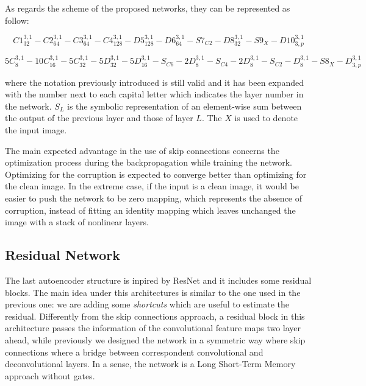 \documentclass[12pt,a4paper]{report}
\begin{document}
As regards the scheme of the proposed networks, they can be represented as follow:

\begin{equation}
C1_{32}^{3,1} - C2_{64}^{3,1} - C3_{64}^{3,1} - C4_{128}^{3,1} - D5_{128}^{3,1} - D6_{64}^{3,1} - S7_{C2} - D8_{32}^{3,1} - S9_X - D10_{3,p}^{3,1} 
\end{equation}

\begin{equation}
5C_{8}^{3,1} - 10C_{16}^{3,1} - 5C_{32}^{3,1} - 5D_{32}^{3,1} - 5D_{16}^{3,1} - S_{C6} - 2D_{8}^{3,1} - S_{C4} - 2D_{8}^{3,1} - S_{C2} -D_{8}^{3,1} - S8_X - D_{3,p}^{3,1} 
\end{equation}

where the notation previously introduced is still valid and it has been expanded with the number next to each capital letter which indicates the layer number in the network. $S_{L}$ is the symbolic representation of an element-wise sum between the output of the previous layer and those of layer $L$. The $X$ is used to denote the input image. 

The main expected advantage in the use of skip connections concerns the optimization process during the backpropagation while training the network. Optimizing for the corruption is expected to converge better than optimizing for the clean image. In the extreme case, if the input is a clean image, it
would be easier to push the network to be zero mapping, which represents the absence of corruption, instead of fitting an identity mapping which leaves unchanged the image with a stack of nonlinear layers.

\subsection{Residual Network}
The last autoencoder structure is inpired by ResNet \cite{N&Al}\cite{H&X&R} and it includes some residual blocks. The main idea under this architectures is similar to the one used in the previous one: we are adding some \textit{shortcuts} which are useful to estimate the residual. Differently from the skip connections approach, a residual block in this architecture passes the information of the convolutional feature maps two layer ahead, while previously we designed the network in a symmetric way where skip connections where a bridge between correspondent convolutional and deconvolutional layers. In a sense, the network is a Long Short-Term Memory approach without gates. 
\end{document}
